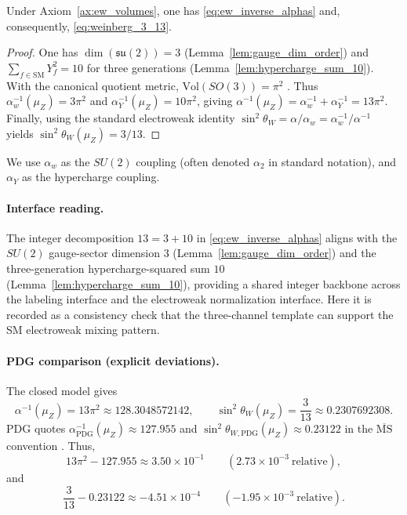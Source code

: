 \begin{theorem}\label{thm:weinberg_angle}
Under Axiom~\ref{ax:ew_volumes}, one has \eqref{eq:ew_inverse_alphas} and, consequently, \eqref{eq:weinberg_3_13}.
\end{theorem}
\begin{proof}
One has $\dim(\mathfrak{su}(2))=3$ (Lemma~\ref{lem:gauge_dim_order}) and $\sum_{f\in\mathrm{SM}}Y_f^2=10$ for three generations (Lemma~\ref{lem:hypercharge_sum_10}).
With the canonical quotient metric, $\mathrm{Vol}(SO(3))=\pi^2$ \cite{Nakahara2003}.
Thus $\alpha_w^{-1}(\mu_Z)=3\pi^2$ and $\alpha_Y^{-1}(\mu_Z)=10\pi^2$, giving $\alpha^{-1}(\mu_Z)=\alpha_w^{-1}+\alpha_Y^{-1}=13\pi^2$.
Finally, using the standard electroweak identity $\sin^2\theta_W=\alpha/\alpha_w=\alpha_w^{-1}/\alpha^{-1}$ \cite{PeskinSchroeder1995,PDGRPP2024} yields $\sin^2\theta_W(\mu_Z)=3/13$.
\end{proof}
\begin{remark}
We use $\alpha_w$ as the $SU(2)$ coupling (often denoted $\alpha_2$ in standard notation), and $\alpha_Y$ as the hypercharge coupling.
\end{remark}
\paragraph{Interface reading.}
The integer decomposition $13=3+10$ in \eqref{eq:ew_inverse_alphas} aligns with the $SU(2)$ gauge-sector dimension $3$ (Lemma~\ref{lem:gauge_dim_order}) and the three-generation hypercharge-squared sum $10$ (Lemma~\ref{lem:hypercharge_sum_10}), providing a shared integer backbone across the labeling interface and the electroweak normalization interface.
Here it is recorded as a consistency check that the three-channel template can support the SM electroweak mixing pattern.

\paragraph{PDG comparison (explicit deviations).}
The closed model gives
\begin{equation}\label{eq:ew_closed_values}
\alpha^{-1}(\mu_Z)=13\pi^2\approx 128.3048572142,
\qquad
\sin^2\theta_W(\mu_Z)=\frac{3}{13}\approx 0.2307692308.
\end{equation}
PDG quotes $\alpha^{-1}_{\mathrm{PDG}}(\mu_Z)\approx 127.955$ and $\sin^2\theta_{W,\mathrm{PDG}}(\mu_Z)\approx 0.23122$ in the $\overline{\mathrm{MS}}$ convention \cite{PDGRPP2024}.
Thus,
\begin{equation}\label{eq:ew_deviation_alphaZ}
13\pi^2-127.955\approx 3.50\times 10^{-1}\qquad (2.73\times 10^{-3}\ \text{relative}),
\end{equation}
and
\begin{equation}\label{eq:ew_deviation_sin2}
\frac{3}{13}-0.23122\approx -4.51\times 10^{-4}\qquad (-1.95\times 10^{-3}\ \text{relative}).
\end{equation}

